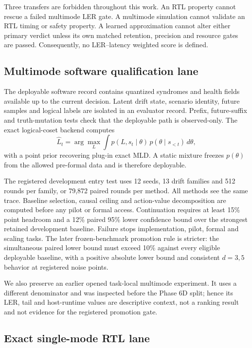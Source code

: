 \documentclass[11pt]{article}
\begin{document}
Three transfers are forbidden throughout this work.  An RTL property cannot
rescue a failed multimode LER gate.  A multimode simulation cannot validate an
RTL timing or safety property.  A learned approximation cannot alter either
primary verdict unless its own matched retention, precision and resource gates
are passed.  Consequently, no LER--latency weighted score is defined.

\subsection{Multimode software qualification lane}

The deployable software record contains quantized syndromes and health fields
available up to the current decision.  Latent drift state, scenario identity,
future samples and logical labels are isolated in an evaluator record.  Prefix,
future-suffix and truth-mutation tests check that the deployable path is
observed-only.  The exact logical-coset backend computes
\begin{equation}
  \widehat L_t=\arg\max_L
  \int p(L,s_t\mid\theta)\,p(\theta\mid s_{<t})\,d\theta,
\end{equation}
with a point prior recovering plug-in exact MLD.  A static mixture freezes
$p(\theta)$ from the allowed pre-formal data and is therefore deployable.

The registered development entry test uses 12 seeds, 13 drift families and
512 rounds per family, or 79,872 paired rounds per method.  All methods see the
same trace.  Baseline selection, causal ceiling and action-value decomposition
are computed before any pilot or formal access.  Continuation requires at
least 15\% point headroom and a 12\% paired 95\% lower confidence bound over the
strongest retained development baseline.  Failure stops implementation,
pilot, formal and scaling tasks.  The later frozen-benchmark promotion rule is
stricter: the simultaneous paired lower bound must exceed 10\% against every
eligible deployable baseline, with a positive absolute lower bound and
consistent $d=3,5$ behavior at registered noise points.

We also preserve an earlier opened task-local multimode experiment.  It uses a
different denominator and was inspected before the Phase 6D split; hence its
LER, tail and host-runtime values are descriptive context, not a ranking result
and not evidence for the registered promotion gate.

\subsection{Exact single-mode RTL lane}
\end{document}
